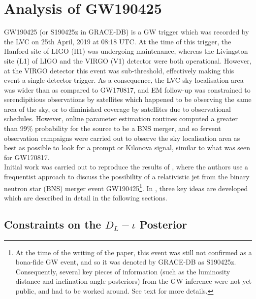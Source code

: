 \section{Analysis of GW190425}\label{sec:190425}

    GW190425 (or S190425z in GRACE-DB) is a GW trigger which was recorded by the LVC on
    25th April, 2019 at 08:18 UTC. At the time of this trigger, the Hanford site of LIGO
    (H1) was undergoing maintenance, whereas the Livingston site (L1) of LIGO and the
    VIRGO (V1) detector were both operational. However, at the VIRGO detector this event
    was sub-threshold, effectively making this event a single-detector trigger. As a
    consequence, the LVC sky localisation area was wider than as compared to GW170817,
    and EM follow-up was constrained to serendipitious observations by satellites which
    happened to be observing the same area of the sky, or to diminished coverage by
    satellites due to observational schedules. However, online parameter estimation
    routines computed a greater than 99\% probability for the source to be a BNS merger,
    and so fervent observation campaigns were carried out to observe the sky
    localisation area as best as possible to look for a prompt or Kilonova signal,
    similar to what was seen for GW170817.\\
    Initial work was carried out to reproduce the results of \cite{saleem_2020B}, where
    the authors use a frequentist approach to discuss the possibility of a relativistic
    jet from the binary neutron star (BNS) merger event GW190425\footnote
    {
        At the time of the writing of the paper, this event was still not confirmed as a
        bona-fide GW event, and so it was denoted by GRACE-DB as S190425z. Consequently,
        several key pieces of information (such as the luminosity distance and
        inclination angle posteriors) from the GW inference were not yet public, and had
        to be worked around. See text for more details.
    }. In \cite{saleem_2020B}, three key ideas are developed which are described in
    detail in the following sections.

    \subsection{Constraints on the \texorpdfstring{$D_L-\iota$}{dL-iota} Posterior}
    \label{sec:dl-iota_posterior}

